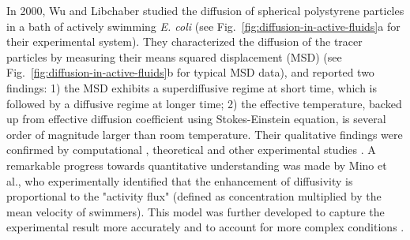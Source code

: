 In 2000, Wu and Libchaber studied the diffusion of spherical polystyrene particles in a bath of actively swimming \textit{E. coli} \cite{Wu2000} (see Fig.~\ref{fig:diffusion-in-active-fluids}a for their experimental system). They characterized the diffusion of the tracer particles by measuring their means squared displacement (MSD) (see Fig.~\ref{fig:diffusion-in-active-fluids}b for typical MSD data), and reported two findings: 1) the MSD exhibits a superdiffusive regime at short time, which is followed by a diffusive regime at longer time; 2) the effective temperature, backed up from effective diffusion coefficient using Stokes-Einstein equation, is several order of magnitude larger than room temperature. Their qualitative findings were confirmed by computational \cite{Underhill2008, Lin2011}, theoretical \cite{Golestanian2009} and other experimental studies
\cite{Chen2007, Leptos2009, Mino2011, Kurtuldu2011, Patteson2016}. A remarkable progress towards quantitative understanding was made by Mino et al., who experimentally identified that the enhancement of diffusivity is proportional to the "activity flux" (defined as concentration multiplied by the mean velocity of swimmers). This model was further developed to capture the experimental result more accurately and to account for more complex conditions \cite{Mino2013, Kasyap2014, Morozov2014}.

